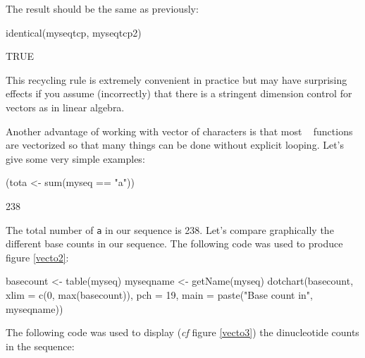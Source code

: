 \documentclass{article}
\begin{document}
\begin{enumerate}
The result should be the same as previously:

\begin{Schunk}
\begin{Sinput}
  identical(myseqtcp, myseqtcp2)
\end{Sinput}
\begin{Soutput}
[1] TRUE
\end{Soutput}
\end{Schunk}

This recycling rule is extremely convenient in practice but may have surprising
effects if you assume (incorrectly) that there is a stringent dimension control for \Rlogo{}~ vectors
as in linear algebra.

\end{enumerate}

Another advantage of working with vector of characters is that most \Rlogo{}~ functions
are vectorized so that many things can be done without explicit looping. Let's
give some very simple examples:

\begin{Schunk}
\begin{Sinput}
 (tota <- sum(myseq == "a"))
\end{Sinput}
\begin{Soutput}
[1] 238
\end{Soutput}
\end{Schunk}

The total number of \texttt{a} in our sequence is 238. Let's compare
graphically the different base counts in our sequence. The following code was used to
produce figure \ref{vecto2}:

\begin{figure}
\centering{}
\end{figure}

\begin{Schunk}
\begin{Sinput}
 basecount <- table(myseq)
 myseqname <- getName(myseq)
 dotchart(basecount, xlim = c(0, max(basecount)), pch = 19,
   main = paste("Base count in",  myseqname))
\end{Sinput}
\end{Schunk}

The following code was used to display (\textit{cf} figure \ref{vecto3}) 
the dinucleotide counts in the sequence:
\end{document}
